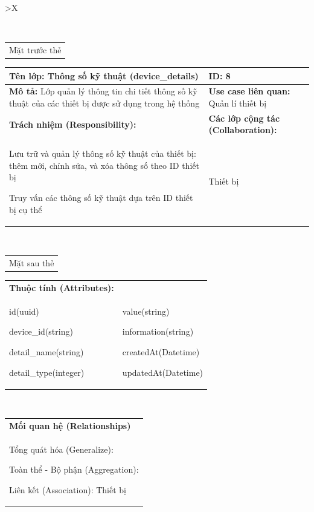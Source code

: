 \begin{xltabular}{\textwidth}{
		>{\centering\arraybackslash}X
	}
	\caption{\bfseries \fontsize{12pt}{0pt}\selectfont Thẻ CRC lớp Thông số kỹ thuật}
	\\
	\begin{tabularx}{0.9\textwidth}{X}
		Mặt trước thẻ
	\end{tabularx}
	\begin{tabularx}{0.9\textwidth}{|X|X|}
		\hline
		\textbf{Tên lớp:} Thông số kỹ thuật (device\_details)                                                         & \textbf{ID:} 8                                 \\
		\hline
		\textbf{Mô tả:} Lớp quản lý thông tin chi tiết thông số kỹ thuật của các thiết bị được sử dụng trong hệ thống & \textbf{Use case liên quan:}  Quản lí thiết bị \\
		\hline
		\textbf{Trách nhiệm (Responsibility):}                                                                        & \textbf{Các lớp cộng tác (Collaboration):}     \\
		Lưu trữ và quản lý thông số kỹ thuật của thiết bị: thêm mới, chỉnh sửa, và xóa thông số theo ID thiết bị

		Truy vấn các thông số kỹ thuật dựa trên ID thiết bị cụ thể
		                                                                                                              &
		Thiết bị
		\\
		\hline
	\end{tabularx}
	\\
	\begin{tabularx}{0.9\textwidth}{X}
		Mặt sau thẻ
	\end{tabularx}
	\begin{tabularx}{0.9\textwidth}{|X|X|}
		\hline
		\textbf{Thuộc tính (Attributes):} & \\
		id(uuid)

		device\_id(string)

		detail\_name(string)

		detail\_type(integer)
		                                  &
		value(string)

		information(string)

		createdAt(Datetime)

		updatedAt(Datetime)
		\\ \hline
	\end{tabularx}
	\\
	\begin{tabularx}{0.9\textwidth}{|X|}
		\hline
		\textbf{Mối quan hệ (Relationships)} \\
		Tổng quát hóa (Generalize):

		Toàn thể - Bộ phận (Aggregation):

		Liên kết (Association): Thiết bị
		\\
		\hline
	\end{tabularx}
\end{xltabular}

